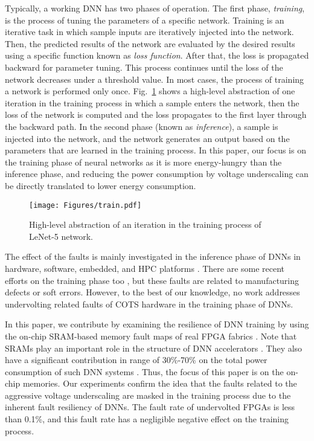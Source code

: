 \documentclass[conference]{IEEEtran}
\begin{document}
Typically, a working DNN has two phases of operation. The first phase, \textit{training}, is the process of tuning the parameters of a specific network. Training is an iterative task in which sample inputs are iteratively injected into the network. Then, the predicted results of the network are evaluated by the desired results using a specific function known as \textit{loss function}. After that, the loss is propagated backward for parameter tuning. This process continues until the loss of the network decreases under a threshold value. In most cases, the process of training a network is performed only
once. Fig.~\ref{fig:train} shows a high-level abstraction of one iteration in the training process in which a sample enters the network, then the loss of the network is computed and the loss propagates to the first layer through the backward path. In the second phase (known as  \textit{inference}), a sample is injected into the network, and the network generates an output based on the parameters that are learned in the training process. In this paper, our focus is on the training phase of neural networks as it is more energy-hungry than the inference phase, and reducing the power consumption by voltage underscaling can be directly translated to lower energy consumption.\color{black}
 \begin{figure}[t]
\centerline{    \texttt{[image: Figures/train.pdf]}}
\caption{High-level abstraction of an iteration in the training process of LeNet-5 network.}
\label{fig:train}
\end{figure}
\color{black}
The effect of the faults is mainly investigated in the inference phase of DNNs in hardware, software, embedded, and HPC platforms \cite{kumar2017survey}. There are some recent efforts on the training phase too \cite{zhang2018analyzing, hacene2019training}, but these faults are related to manufacturing defects or soft errors.
 However, to the best of our knowledge, no work addresses undervolting related faults of COTS hardware in the training phase of DNNs. 

In this paper, we contribute by examining the resilience of DNN training by using the on-chip SRAM-based memory fault maps of real FPGA fabrics \cite{salami2018comprehensive}. Note that SRAMs play an important role in the structure of DNN accelerators \cite{guo2017survey}. They also have a significant contribution in range of 30\%-70\% on the total power consumption of such DNN systems \cite{salamat2019workload, conti2018xnor}. Thus, the focus of this paper is on the on-chip memories. Our experiments confirm the idea that the faults related to the aggressive voltage underscaling are masked in the training process due to the inherent fault resiliency of DNNs. The fault rate of undervolted FPGAs is less than 0.1\%, and this fault rate has a negligible negative effect on the training process.
\end{document}
